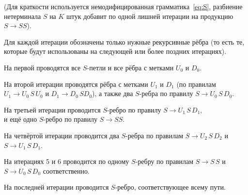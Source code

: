 (Для краткости используется немодифицированная грамматика~\ref{eq:S}, разбиение нетерминала $S$ на $K$ штук добавит по одной лишней итерации на продукцию $S \to SS$).

Для каждой итерации обозначены только нужные рекурсивные рёбра (то есть те, которые будут использованы на следующей или более поздних итерациях).

На первой проводятся все $S$-петли и все рёбра с метками $U_0$ и $D_0$.

На второй итерации проводятся рёбра с метками $U_1$ и $D_1$ (по правилам \\$U_1 \to U_0\,S\,U_0$ и $D_1 \to D_0 \, S D_0$), а также два $S$-ребра по правилу $S \to U_0 \, S \, D_0$.

На третьей итерации проводится $S$-ребро по правилу $S \to U_1 \, S \, D_1$, \\и ещё одно $S$-ребро по правилу $S \to SS$.

На четвёртой итерации проводится два $S$-ребра по правилам $S \to U_2 \, S \, D_2$ и \\$S \to U_1 \, S \, D_1$.

На итерациях 5 и 6 проводится по одному $S$-ребру по правилам $S \to S\,S$ и \\$S \to U_0 \, S \, D_0$ соответственно.

На последней итерации проводится $S$-ребро, соответствующее всему пути. 

